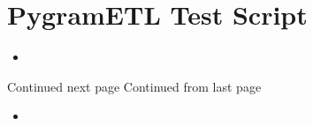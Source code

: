
\section{PygramETL Test Script}
\begin{itemize}
\item[]
\end{itemize}
Continued next page
\clearpage
Continued from last page
\begin{itemize}
\item[]
\end{itemize}
